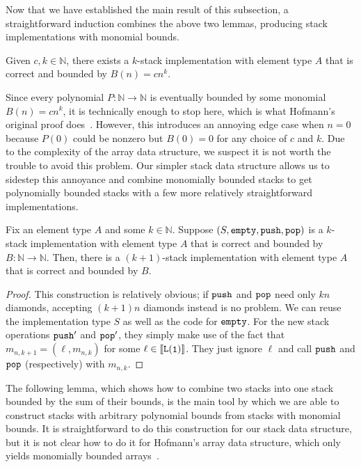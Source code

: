 Now that we have established the main result of this subsection, a straightforward induction combines the above two lemmas, producing stack implementations with monomial bounds.

\begin{lemma}
\label{lem:stack-monomial}
Given $c,k \in \mathbb N$, there exists a $k$-stack implementation with element type $A$ that is correct and bounded by $B(n) = cn^k$.
\end{lemma}

Since every polynomial $P : \mathbb N \to \mathbb N$ is eventually bounded by some monomial $B(n) = cn^k$, it is technically enough to stop here, which is what Hofmann's original proof does~\cite{hofmannStrengthNonsizeIncreasing2002}. However, this introduces an annoying edge case when $n = 0$ because $P(0)$ could be nonzero but $B(0) = 0$ for any choice of $c$ and $k$. Due to the complexity of the array data structure, we suspect it is not worth the trouble to avoid this problem. Our simpler stack data structure allows us to sidestep this annoyance and combine monomially bounded stacks to get polynomially bounded stacks with a few more relatively straightforward implementations.

\begin{lemma}
\label{lem:stack-weakened}
Fix an element type $A$ and some $k \in \mathbb N$. Suppose $(S, \mathtt{empty}, \mathtt{push}, \mathtt{pop})$ is a $k$-stack implementation with element type $A$ that is correct and bounded by $B : \mathbb N \to \mathbb N$. Then, there is a $(k + 1)$-stack implementation with element type $A$ that is correct and bounded by $B$. 
\end{lemma}
\begin{proof}
This construction is relatively obvious; if $\mathtt{push}$ and $\mathtt{pop}$ need only $kn$ diamonds, accepting $(k + 1)n$ diamonds instead is no problem. We can reuse the implementation type $S$ as well as the code for $\mathtt{empty}$. For the new stack operations $\mathtt{push}'$ and $\mathtt{pop}'$, they simply make use of the fact that $m_{n,k+1} = (\ell,m_{n,k})$ for some $\ell \in \tpsem{\tplist{\tpunit}}$. They just ignore $\ell$ and call $\mathtt{push}$ and $\mathtt{pop}$ (respectively) with $m_{n,k}$.
\end{proof}

The following lemma, which shows how to combine two stacks into one stack bounded by the sum of their bounds, is the main tool by which we are able to construct stacks with arbitrary polynomial bounds from stacks with monomial bounds. It is straightforward to do this construction for our stack data structure, but it is not clear how to do it for Hofmann's array data structure, %
which only yields monomially bounded arrays~\cite{hofmannStrengthNonsizeIncreasing2002}.


